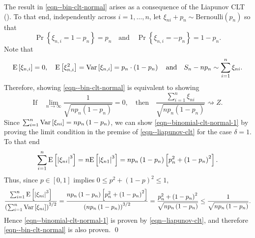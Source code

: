 The result in \eqref{eqn--bin-clt-normal} arises as a consequence of the
Liapunov CLT ().
To that end, independently across \(i = 1, \dots, n\),
let \(\xi_{n i} + p_{n} \sim \mathrm{Bernoulli} \left( p_{n} \right)\) so that
\begin{equation*}
  \Pr \left\{ \xi_{n, i} = 1 - p_{n} \right\} = p_{n} \quad \text{and}
  \quad \Pr \left\{ \xi_{n, i} = - p_{n} \right\} = 1 - p_{n}.
\end{equation*}
Note that
\begin{equation*}
  \mathrm{E} \left[ \xi_{n, i} \right] = 0, \quad \mathrm{E} \left[ \xi_{n, i}^{2} \right] =
  \mathrm{Var} \left[ \xi_{n, i} \right] = p_{n} \cdot \left( 1 - p_{n} \right) \quad
  \text{and} \quad S_{n} - n p_{n} \sim \sum_{i = 1}^{n} \xi_{n i}.
\end{equation*}
Therefore, showing \eqref{eqn--bin-clt-normal} is equivalent to showing
\begin{equation}
  \text{If} \quad \lim_{n \to \infty} \frac{1}{\sqrt{n p_{n} \left( 1 - p_{n}
  \right)}} = 0, \quad \text{then} \quad \frac{\sum_{i = 1}^{n} \xi_{n
  i}}{\sqrt{n p_{n} (1 - p_{n})}} \rightsquigarrow Z.
  \label{eqn--binomial-clt-normal-1}
\end{equation}
Since \(\sum_{i = 1}^{n} \mathrm{Var} \left[ \xi_{n i} \right] = n p_{n} \left( 1 -
p_{n} \right)\), we can show \eqref{eqn--binomial-clt-normal-1} by proving the
limit condition in the premise of \eqref{eqn--liapunov-clt}
for the case \(\delta = 1\).
To that end
\begin{equation*}
  \sum_{i = 1}^{n} \mathrm{E} \left[ \left| \xi_{n i} \right|^{3} \right] = n \mathrm{E} \left[
  \left| \xi_{n 1} \right|^{3} \right] = n p_{n} \left( 1 - p_{n} \right) \left[
  p_{n}^{2} + \left( 1 - p_{n} \right)^{2} \right].
\end{equation*}
Thus, since \(p \in [0, 1]\) implies \(0 \leq p^{2} + (1 - p)^{2} \leq 1\),
\begin{equation*}
   \frac{\sum_{i = 1}^{n} \mathrm{E} \left[ \left| \xi_{n i} \right|^{3} \right]}{\left(
   \sum_{i = 1}^{n} \mathrm{Var} \left[ \xi_{n i} \right] \right)^{3 / 2}} = \frac{n
   p_{n} \left( 1 - p_{n} \right) \left[ p_{n}^{2} + \left( 1 - p_{n}
   \right)^{2} \right]}{\left( n p_{n} \left( 1 - p_{n} \right) \right)^{3 / 2}}
   = \frac{p_{n}^{2} + \left( 1 - p_{n} \right)^{2}}{\sqrt{n p_{n} \left( 1 -
   p_{n} \right)}} \leq \frac{1}{\sqrt{n p_{n} \left( 1 -
   p_{n} \right)}}.
\end{equation*}
Hence \eqref{eqn--binomial-clt-normal-1} is proven by \eqref{eqn--liapunov-clt},
and therefore \eqref{eqn--bin-clt-normal} is also proven.
\qed

